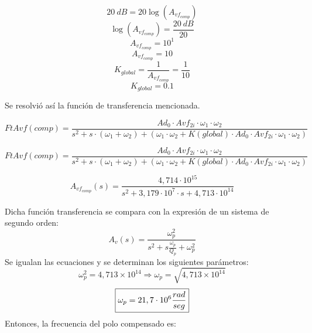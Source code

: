 \[20~dB= 20 \log(A_{vf_{comp}})\]
\[\log(A_{vf_{comp}})=\frac{20~dB}{20}\]
\[A_{vf_{comp}}=10^{1}\]
\[A_{vf_{comp}}=10\]
\begin{equation}
    K_{global} = \frac{1}{A_{vf_{comp}}} = \frac{1}{10}
\end{equation}
\begin{equation}
    \boxed{
    K_{global} = 0.1
    }
\end{equation}

\bigskip
\hspace{1mm} Se resolvió así la función de transferencia mencionada.

\begin{equation}
    FtAvf (comp) = \frac{Ad_0 \cdot Avf_{2i} \cdot \omega_1 \cdot \omega_2}{s^2 + s \cdot (\omega_1 + \omega_2) + (\omega_1 \cdot \omega_2 + K (global) \cdot Ad_0 \cdot Avf_{2i} \cdot \omega_1 \cdot \omega_2)}
\end{equation}

\begin{equation}
    FtAvf (comp) = \frac{Ad_0 \cdot Avf_{2i} \cdot \omega_1 \cdot \omega_2}{s^2 + s \cdot (\omega_1 + \omega_2) + (\omega_1 \cdot \omega_2 + K (global) \cdot Ad_0 \cdot Avf_{2i} \cdot \omega_1 \cdot \omega_2)}
\end{equation}

\begin{equation}
    A_{vf_{comp}}(s) = \frac{4,714 \cdot 10^{15}}{s^2 + 3,179 \cdot 10^7 \cdot s + 4,713 \cdot 10^{14}}
\end{equation}

\bigskip
\hspace{1mm} Dicha función transferencia se compara con la expresión de un sistema de segundo orden:
\begin{equation}
    A_{v}(s) = \frac{\omega _p^2}{s^2 + s \frac{\omega _p}{Q_p } + \omega_p^2}
\end{equation}  
\bigskip
\hspace{1mm} Se igualan las ecuaciones y se determinan los siguientes parámetros:
\begin{equation}
    \omega _p ^2 = 4,713 \times 10^{14} \Longrightarrow \omega_p =\sqrt{4,713 \times 10^{14}} 
\end{equation}
\begin{equation}
    \boxed{
        \omega_p = 21,7 \cdot 10^6 \space \frac{rad}{seg} 
    }
\end{equation}
\bigskip
\hspace{1mm} Entonces, la frecuencia del polo compensado es:

